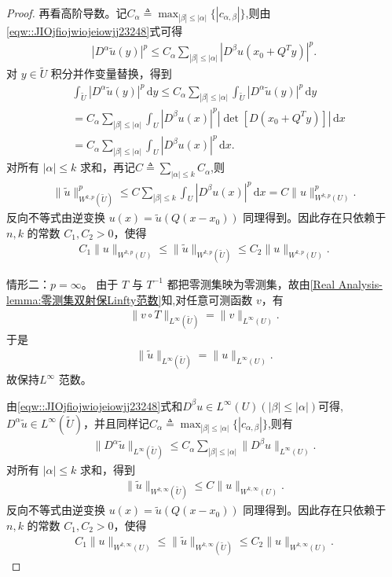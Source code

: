 \documentclass[../../main.tex]{subfiles}%
\begin{document}
\begin{proof}
再看高阶导数。记$C_\alpha\triangleq \max_{|\beta|\leqslant |\alpha|}\{|c_{\alpha,\beta}|\}$,则由\eqref{eqw::JIOjfiojwiojeiowjj23248}式可得
\begin{align*}
|D^\alpha\tilde u(y)|^p
\leqslant C_\alpha\sum\limits_{|\beta|\leqslant|\alpha|}|D^\beta u(x_0+Q^T y)|^p.
\end{align*}
对 $y\in\widetilde U$ 积分并作变量替换，得到
\begin{align*}
&\int_{\widetilde{U}}{|D^{\alpha}\tilde{u}(y)|^p\,\mathrm{d}y}\leqslant C_{\alpha}\sum_{|\beta |\leqslant |\alpha |}{\int_{\widetilde{U}}{|D^{\alpha}\tilde{u}(y)|^p\,\mathrm{d}y}}\\
&=C_{\alpha}\sum_{|\beta |\leqslant |\alpha |}{\int_U{|D^{\beta}u(x)|^p\left|\det \left[ D\left( x_0+Q^Ty \right) \right]\right| \,\mathrm{d}x}}\\
&=C_{\alpha}\sum_{|\beta |\leqslant |\alpha |}{\int_U{|D^{\beta}u(x)|^p\,\mathrm{d}x}}.
\end{align*}
对所有 $|\alpha|\leqslant k$ 求和，再记$C\triangleq \sum_{|\alpha|\leqslant k}C_\alpha$,则
\begin{align*}
\|\tilde u\|_{W^{k,p}(\widetilde U)}^p
\leqslant C\sum\limits_{|\beta|\leqslant k}\int_U|D^\beta u(x)|^p\,\mathrm dx
=C\|u\|_{W^{k,p}(U)}^p.
\end{align*}
反向不等式由逆变换 $u(x)=\tilde u(Q(x-x_0))$ 同理得到。因此存在只依赖于 $n,k$ 的常数 $C_1,C_2>0$，使得
\begin{align*}
C_1\|u\|_{W^{k,p}(U)}\leqslant\|\tilde u\|_{W^{k,p}(\widetilde U)}\leqslant C_2\|u\|_{W^{k,p}(U)}.
\end{align*}

{\heiti 情形二：$p=\infty$。}
由于 $T$ 与 $T^{-1}$ 都把零测集映为零测集，故由\cref{Real Analysis-lemma:零测集双射保Linfty范数}知,对任意可测函数 $v$，有
\begin{align*}
\|v\circ T\|_{L^\infty(\widetilde U)}=\|v\|_{L^\infty(U)}.
\end{align*}
于是
\begin{align*}
\|\tilde u\|_{L^\infty(\widetilde U)}=\|u\|_{L^\infty(U)}.
\end{align*}
故保持$L^\infty$ 范数。

由\eqref{eqw::JIOjfiojwiojeiowjj23248}式和$D^\beta u\in L^\infty(U)(|\beta|\leqslant |\alpha|)$可得,$D^\alpha\tilde u\in L^\infty(\widetilde U)$，并且同样记$C_\alpha\triangleq \max_{|\beta|\leqslant |\alpha|}\{|c_{\alpha,\beta}|\}$,则有
\begin{align*}
\|D^\alpha\tilde u\|_{L^\infty(\widetilde U)}
\leqslant C_\alpha\sum\limits_{|\beta|\leqslant|\alpha|}\|D^\beta u\|_{L^\infty(U)}.
\end{align*}
对所有 $|\alpha|\leqslant k$ 求和，得到
\begin{align*}
\|\tilde u\|_{W^{k,\infty}(\widetilde U)}
\leqslant C\|u\|_{W^{k,\infty}(U)}.
\end{align*}
反向不等式由逆变换 $u(x)=\tilde u(Q(x-x_0))$ 同理得到。因此存在只依赖于 $n,k$ 的常数 $C_1,C_2>0$，使得
\begin{align}\label{eq::fjiosdijojioFJIOJIOSIJO}
C_1\|u\|_{W^{k,\infty}(U)}\leqslant\|\tilde u\|_{W^{k,\infty}(\widetilde U)}\leqslant C_2\|u\|_{W^{k,\infty}(U)}.
\end{align}


\end{proof}
\end{document}
